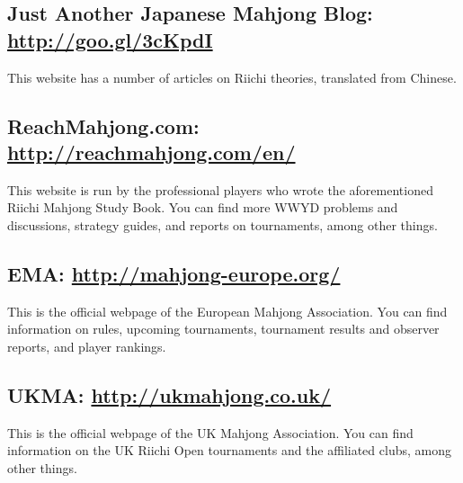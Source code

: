 \subsection*{Just Another Japanese Mahjong Blog: \\\url{http://goo.gl/3cKpdI}}
This website has a number of articles on Riichi theories, translated from Chinese. 

\subsection*{ReachMahjong.com: \url{http://reachmahjong.com/en/}}
This website is run by the professional players who wrote the aforementioned Riichi Mahjong Study Book. You can find more WWYD problems and discussions, strategy guides, and reports on tournaments, among other things. 

\subsection*{EMA: \url{http://mahjong-europe.org/}} 
This is the official webpage of the European Mahjong Association. You can find information on rules, upcoming tournaments, tournament results and observer reports, and player rankings. 

\subsection*{UKMA: \url{http://ukmahjong.co.uk/}} 
This is the official webpage of the UK Mahjong Association. You can find information on the UK Riichi Open tournaments and the affiliated clubs, among other things. 

